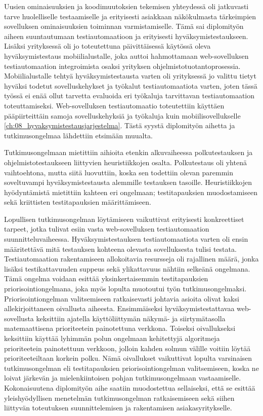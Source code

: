   Uusien ominaisuuksien ja koodimuutoksien tekemisen yhteydessä oli jatkuvasti tarve huolelliselle testaamiselle ja erityisesti asiakkaan näkökulmasta tärkeimpien sovelluksen ominaisuuksien toiminnan varmistamiselle.
  Tämä sai diplomityön aiheen suuntautumaan testiautomaatioon ja erityisesti hyväksymistestaukseen.
  Lisäksi yrityksessä oli jo toteutettuna päivittäisessä käytössä oleva hyväksymistestaus mobiilialustalle, joka auttoi hahmottamaan web-sovelluksen testiautomaation integroimista osaksi yrityksen ohjelmistotuotantoprosessia.
  Mobiilialustalle tehtyä hyväksymistestausta varten oli yrityksessä jo valittu tietyt hyväksi todetut sovelluskehykset ja työkalut testiautomaatiota varten, joten tässä työssä ei enää ollut tarvetta evaluoida eri työkaluja tarvittavan testiautomaation toteuttamiseksi.
  Web-sovelluksen testiautomaatio toteutettiin käyttäen pääpiirteittäin samoja sovelluskehyksiä ja työkaluja kuin mobiilisovellukselle \ref{ch:08_hyvaksymistestausjarjestelma}.
  Tästä syystä diplomityön aihetta ja tutkimusongelmaa lähdettiin etsimään muualta.

  Tutkimusongelmaan mietittiin aihioita etenkin alkuvaiheessa polkutestauksen ja ohjelmistotestaukseen liittyvien heuristiikkojen osalta.
  Polkutestaus oli yhtenä vaihtoehtona, mutta siitä luovuttiin, koska sen todettiin olevan paremmin soveltuvampi hyväksymistestausta alemmille testauksen tasoille.
  Heuristiikkojen hyödyntämistä mietittiin kahteen eri ongelmaan; testitapauksien muodostamiseen sekä kriittisten testitapauksien määrittämiseen.

  Lopullisen tutkimusongelman löytämiseen vaikuttivat erityisesti konkreettiset tarpeet, jotka tulivat esiin vasta web-sovelluksen testiautomaation suunnitteluvaiheessa.
  Hyväksymistestauksen testiautomaatiota varten oli ensin määritettävä mitä testauksen kohteena olevasta sovelluksesta tulisi testata.
  Testiautomaation rakentamiseen allokoitavia resursseja oli rajallinen määrä, jonka lisäksi testikattavuuden suppeus sekä ylikattavuus nähtiin selkeänä ongelmana.
  Tämä ongelma voidaan esittää yksinkertaisemmin testitapauksien priorisointiongelmana, joka myös lopulta muotoutui työn tutkimusongelmaksi.
  Priorisointiongelman valitsemiseen ratkaisevasti johtavia asioita olivat kaksi allekirjoittaneen oivallusta aiheesta.
  Ensimmäiseksi hyväksymistestattavaa web-sovellusta keksittiin ajatella käyttöliittymän näkymä- ja siirtymätasolla matemaattisena prioriteetein painotettuna verkkona.
  Toiseksi oivallukseksi keksittiin käyttää lyhimmän polun ongelmaan kehitettyjä algoritmeja prioriteetein painotettuun verkkoon, jolloin kahden solmun välille voitiin löytää prioriteeteiltaan korkein polku.
  Nämä oivallukset vaikuttivat lopulta varsinaisen tutkimusongelman eli testitapauksien priorisointiongelman valitsemiseen, koska ne loivat järkevän ja mielenkiintoisen pohjan tutkimusongelmaan vastaamiselle.
  Kokonaisuutena diplomityön aihe saatiin muodostettua sellaiseksi, että se esittää yleishyödyllisen menetelmän tutkimusongelman ratkaisemiseen sekä siihen liittyvän toteutuksen suunnittelemisen ja rakentamisen asiakasyritykselle.

